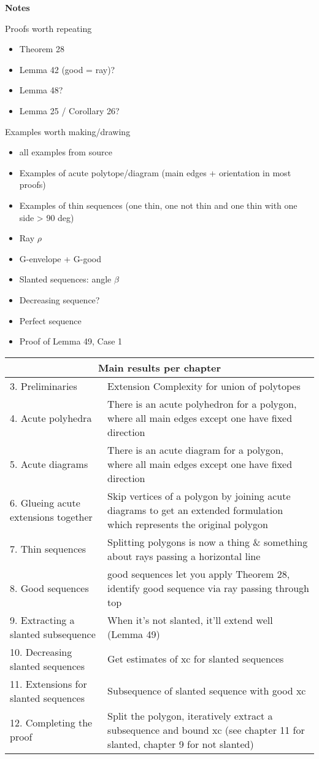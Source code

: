 \newpage
{\Huge \textbf{Notes}}

Proofs worth repeating
\begin{itemize}
  \item Theorem 28
  \item Lemma 42 (good = ray)?
  \item Lemma 48?
  \item Lemma 25 / Corollary 26?
\end{itemize}

Examples worth making/drawing
\begin{itemize}
  \item all examples from source
  \item Examples of acute polytope/diagram (main edges + orientation in most proofs)
  \item Examples of thin sequences (one thin, one not thin and one thin with one side > 90 deg)
  \item Ray $\rho$
  \item G-envelope + G-good
  \item Slanted sequences: angle $\beta$
  \item Decreasing sequence?
  \item Perfect sequence
  \item Proof of Lemma 49, Case 1
\end{itemize}

\begin{tabular}{| p{50mm} | p{100mm} |}
  \hline
  \multicolumn{2}{|c|}{\textbf{Main results per chapter}}\\ \hline
  3. Preliminaries & Extension Complexity for union of polytopes \\ \hline
  4. Acute polyhedra & There is an acute polyhedron for a polygon, where all main edges except one have fixed direction \\ \hline
  5. Acute diagrams & There is an acute diagram for a polygon, where all main edges except one have fixed direction \\ \hline
  6. Glueing acute extensions together & Skip vertices of a polygon by joining acute diagrams to get an extended formulation which represents the original polygon \\ \hline
  7. Thin sequences & Splitting polygons is now a thing \& something about rays passing a horizontal line \\ \hline
  8. Good sequences & good sequences let you apply Theorem 28, identify good sequence via ray passing through top \\ \hline
  9. Extracting a slanted subsequence & When it's not slanted, it'll extend well (Lemma 49) \\ \hline
  10. Decreasing slanted sequences & Get estimates of xc for slanted sequences \\ \hline
  11. Extensions for slanted sequences & Subsequence of slanted sequence with good xc \\ \hline
  12. Completing the proof & Split the polygon, iteratively extract a subsequence and bound xc (see chapter 11 for slanted, chapter 9 for not slanted) \\ \hline
\end{tabular}
